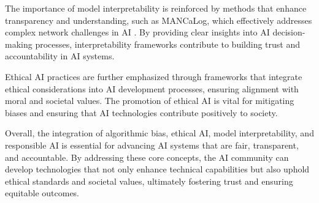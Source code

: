 The importance of model interpretability is reinforced by methods that enhance transparency and understanding, such as MANCaLog, which effectively addresses complex network challenges in AI \cite{shakarian2022reasoningcomplexnetworkslogic}. By providing clear insights into AI decision-making processes, interpretability frameworks contribute to building trust and accountability in AI systems.



Ethical AI practices are further emphasized through frameworks that integrate ethical considerations into AI development processes, ensuring alignment with moral and societal values. The promotion of ethical AI is vital for mitigating biases and ensuring that AI technologies contribute positively to society.



Overall, the integration of algorithmic bias, ethical AI, model interpretability, and responsible AI is essential for advancing AI systems that are fair, transparent, and accountable. By addressing these core concepts, the AI community can develop technologies that not only enhance technical capabilities but also uphold ethical standards and societal values, ultimately fostering trust and ensuring equitable outcomes.